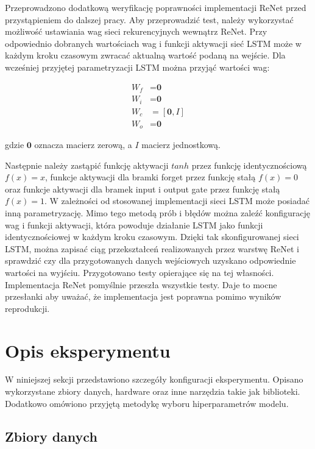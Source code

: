 \documentclass[oneside, mag]{mgr}
\newcommand{\bb}{\textbf}
\begin{document}
Przeprowadzono dodatkową weryfikację poprawności implementacji ReNet przed przystąpieniem do dalszej pracy. Aby przeprowadzić test, należy wykorzystać możliwość ustawiania wag sieci rekurencyjnych wewnątrz ReNet. Przy odpowiednio dobranych wartościach wag i funkcji aktywacji sieć LSTM może w każdym kroku czasowym zwracać aktualną wartość podaną na wejście. Dla wcześniej przyjętej parametryzacji LSTM można przyjąć wartości wag:

\begin{align*}
	W_f &= \bb{0} \\
	W_i &= \bb{0} \\
	W_c &= [\bb{0},I] \\
	W_o &= \bb{0}
\end{align*}

gdzie $\bb{0}$ oznacza macierz zerową, a $I$ macierz jednostkową.

Następnie należy zastąpić funkcję aktywacji $tanh$ przez funkcję identycznościową $f(x) = x$, funkcje aktywacji dla bramki forget przez funkcję stałą $f(x) = 0$ oraz funkcje aktywacji dla bramek input i output gate przez funkcję stałą $f(x) = 1$. W zależności od stosowanej implementacji sieci LSTM może posiadać inną parametryzację. Mimo tego metodą prób i błędów można zaleźć konfigurację wag i funkcji aktywacji, która powoduje działanie LSTM jako funkcji identycznościowej w każdym kroku czasowym. Dzięki tak skonfigurowanej sieci LSTM, można zapisać ciąg przekształceń realizowanych przez warstwę ReNet i sprawdzić czy dla przygotowanych danych wejściowych uzyskano odpowiednie wartości na wyjściu. Przygotowano testy opierające się na tej własności. Implementacja ReNet pomyślnie przeszła wszystkie  testy. Daje to mocne przesłanki aby uważać, że implementacja jest poprawna pomimo wyników reprodukcji.

\section{Opis eksperymentu}

W niniejszej sekcji przedstawiono szczegóły konfiguracji eksperymentu. Opisano wykorzystane zbiory danych, hardware oraz inne narzędzia takie jak biblioteki. Dodatkowo omówiono przyjętą metodykę wyboru hiperparametrów modelu.

\subsection{Zbiory danych}
\end{document}
